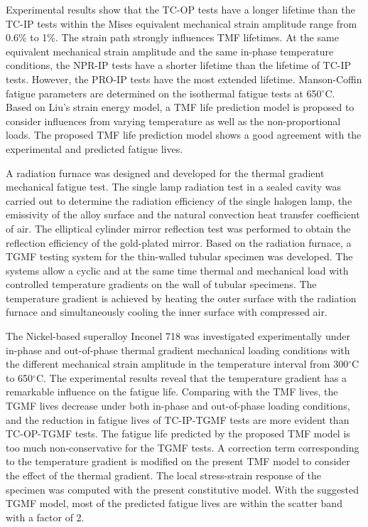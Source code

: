Experimental results show that the TC-OP tests have a longer lifetime than the TC-IP tests within the Mises equivalent mechanical strain amplitude range from 0.6\% to 1\%.
The strain path strongly influences TMF lifetimes. At the same equivalent mechanical strain amplitude and the same in-phase temperature conditions, the NPR-IP tests have a shorter lifetime than the lifetime of TC-IP tests. However, the PRO-IP tests have the most extended lifetime.
Manson-Coffin fatigue parameters are determined on the isothermal fatigue tests at 650$^\circ$C. Based on Liu's strain energy model, a TMF life prediction model is proposed to consider influences from varying temperature as well as the non-proportional loads. The proposed TMF life prediction model shows a good agreement with the experimental and predicted fatigue lives.

A radiation furnace was designed and developed for the thermal gradient mechanical fatigue test. The single lamp radiation test in a sealed cavity was carried out to determine the radiation efficiency of the single halogen lamp, the emissivity of the alloy surface and the natural convection heat transfer coefficient of air. The elliptical cylinder mirror reflection test was performed to obtain the reflection efficiency of the gold-plated mirror. Based on the radiation furnace, a TGMF testing system for the thin-walled tubular specimen was developed. The systems allow a cyclic and at the same time thermal and mechanical load with controlled temperature gradients on the wall of tubular specimens. The temperature gradient is achieved by heating the outer surface with the radiation furnace and simultaneously cooling the inner surface with compressed air. 

The Nickel-based superalloy Inconel 718 was investigated experimentally under in-phase and out-of-phase thermal gradient mechanical loading conditions with the different mechanical strain amplitude in the temperature interval from 300$^\circ$C to 650$^\circ$C. The experimental results reveal that the temperature gradient has a remarkable influence on the fatigue life. Comparing with the TMF lives, the TGMF lives decrease under both in-phase and out-of-phase loading conditions, and the reduction in fatigue lives of TC-IP-TGMF tests are more evident than TC-OP-TGMF tests. The fatigue life predicted by the proposed TMF model is too much non-conservative for the TGMF tests. A correction term corresponding to the temperature gradient is modified on the present TMF model to consider the effect of the thermal gradient. The local stress-strain response of the specimen was computed with the present constitutive model. With the suggested TGMF model, most of the predicted fatigue lives are within the scatter band with a factor of 2.

